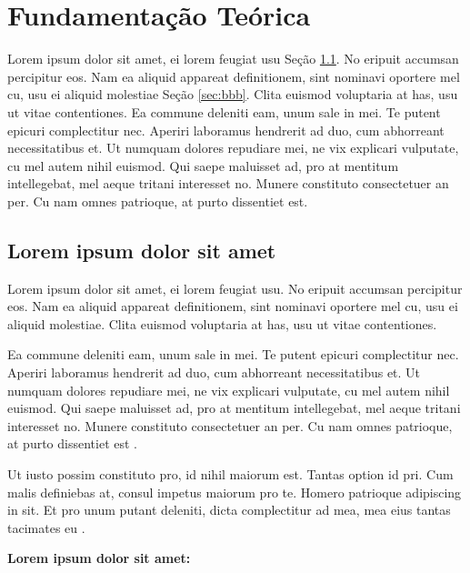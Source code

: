 \chapter{Fundamentação Teórica}
\label{chap:fundamentacao-teorica}

	Lorem ipsum dolor sit amet, ei lorem feugiat usu Seção \ref{sec:aaa}. No eripuit accumsan percipitur eos. Nam ea aliquid appareat definitionem, sint nominavi oportere mel cu, usu ei aliquid molestiae Seção \ref{sec:bbb}. Clita euismod voluptaria at has, usu ut vitae contentiones. Ea commune deleniti eam, unum sale in mei. Te putent epicuri complectitur nec. Aperiri laboramus hendrerit ad duo, cum abhorreant necessitatibus et. Ut numquam dolores repudiare mei, ne vix explicari vulputate, cu mel autem nihil euismod. Qui saepe maluisset ad, pro at mentitum intellegebat, mel aeque tritani interesset no. Munere constituto consectetuer an per. Cu nam omnes patrioque, at purto dissentiet est.

	\section{ Lorem ipsum dolor sit amet}
	\label{sec:aaa}

		Lorem ipsum dolor sit amet, ei lorem feugiat usu. No eripuit accumsan percipitur eos. Nam ea aliquid appareat definitionem, sint nominavi oportere mel cu, usu ei aliquid molestiae. Clita euismod voluptaria at has, usu ut vitae contentiones.

		Ea commune deleniti eam, unum sale in mei. Te putent epicuri complectitur nec. Aperiri laboramus hendrerit ad duo, cum abhorreant necessitatibus et. Ut numquam dolores repudiare mei, ne vix explicari vulputate, cu mel autem nihil euismod. Qui saepe maluisset ad, pro at mentitum intellegebat, mel aeque tritani interesset no. Munere constituto consectetuer an per. Cu nam omnes patrioque, at purto dissentiet est \cite{Omidi2012, Mell2011, Avizienis2004}.

		Ut iusto possim constituto pro, id nihil maiorum est. Tantas option id pri. Cum malis definiebas at, consul impetus maiorum pro te. Homero patrioque adipiscing in sit. Et pro unum putant deleniti, dicta complectitur ad mea, mea eius tantas tacimates eu \cite{Mell2011}.\linebreak[1] \newline

		\noindent \textbf{Lorem ipsum dolor sit amet:}

